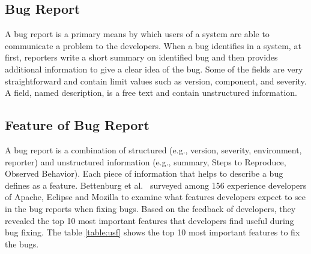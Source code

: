 \documentclass[conference]{IEEEtran}
\begin{document}
\subsection{Bug Report}
A bug report is a primary means by which users of a system are able to communicate a problem to the developers. When a bug identifies in a system, at first, reporters write a short summary on identified bug and then provides additional information to give a clear idea of the bug. Some of the fields are very straightforward and contain limit values such as version, component, and severity. A field, named description, is a free text and contain unstructured information.
\subsection{Feature of Bug Report}
A bug report is a combination of structured (e.g., version, severity, environment, reporter) and unstructured information (e.g., summary, Steps to Reproduce, Observed Behavior). Each piece of information that helps to describe a bug defines as a feature. Bettenburg et al.~\cite{Bettenburg:2008} surveyed among 156 experience developers of Apache, Eclipse and Mozilla to examine what features developers expect to see in the bug reports when fixing bugs. Based on the feedback of developers, they revealed the top 10 most important features that developers find useful during bug fixing. The table \ref{table:usf} shows the top 10 most important features to fix the bugs.
\end{document}
